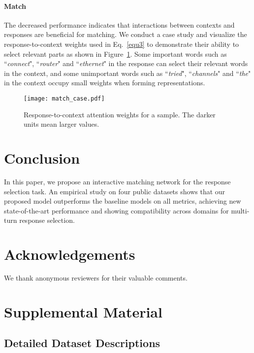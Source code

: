 \documentclass[sigconf]{acmart}
\begin{document}
    \paragraph{Match} The decreased performance indicates that interactions between contexts and responses are beneficial for matching.
    We conduct a case study and visualize the response-to-context weights used in Eq.~\ref{equ3} to demonstrate their ability to select relevant parts as shown in Figure~\ref{fig3}. Some important words such as ``\emph{connect}", ``\emph{router}" and ``\emph{ethernet}" in the response can select their relevant words in the context, and some unimportant words such as ``\emph{tried}", ``\emph{channels}" and ``\emph{the}" in the context occupy small weights when forming representations.

    \begin{figure}
    \centering
    \texttt{[image: match\_case.pdf]}
    \caption{Response-to-context attention weights for a sample. The darker units mean larger values.}
    \label{fig3}
    \end{figure}


\section{Conclusion}
  In this paper, we propose an interactive matching network for the response selection task. An empirical study on four public datasets shows that our proposed model outperforms the baseline models on all metrics, achieving new state-of-the-art performance and showing compatibility across domains for multi-turn response selection.

\section*{Acknowledgements}
  We thank anonymous reviewers for their valuable comments.





\appendix

\section{Supplemental Material}

  \subsection{Detailed Dataset Descriptions}
\end{document}
